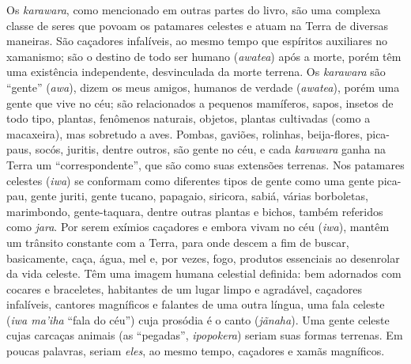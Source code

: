 \noindent Os \emph{karawara}, como mencionado em outras partes do livro, são uma
complexa classe de seres que povoam os patamares celestes e atuam na
Terra de diversas maneiras. São caçadores infalíveis, ao mesmo tempo que
espíritos auxiliares no xamanismo; são o destino de todo ser humano
(\emph{awatea}) após a morte, porém têm uma existência independente,
desvinculada da morte terrena. Os \emph{karawara} são ``gente''
(\emph{awa}), dizem os meus amigos, humanos de verdade (\emph{awatea}),
porém uma gente que vive no céu; são relacionados a pequenos mamíferos,
sapos, insetos de todo tipo, plantas, fenômenos naturais, objetos,
plantas cultivadas (como a macaxeira), mas sobretudo a aves. Pombas,
gaviões, rolinhas, beija-flores, pica-paus, socós, juritis, dentre
outros, são gente no céu, e cada \emph{karawara} ganha na Terra um
``correspondente'', que são como suas extensões terrenas. Nos patamares
celestes (\emph{iwa}) se conformam como diferentes tipos de gente como
uma gente pica-pau, gente juriti, gente tucano, papagaio, siricora,
sabiá, várias borboletas, marimbondo, gente-taquara, dentre outras
plantas e bichos, também referidos como \emph{jara}. Por serem exímios
caçadores e embora vivam no céu (\emph{iwa}), mantêm um trânsito
constante com a Terra, para onde descem a fim de buscar, basicamente,
caça, água, mel e, por vezes, fogo, produtos essenciais ao desenrolar da
vida celeste. Têm uma imagem humana celestial definida: bem adornados
com cocares e braceletes, habitantes de um lugar limpo e agradável,
caçadores infalíveis, cantores magníficos e falantes de uma outra
língua, uma fala celeste (\emph{iwa ma'iha} ``fala do céu'') cuja
prosódia é o canto (\emph{jãnaha}). Uma gente celeste cujas carcaças
animais (as ``pegadas'', \emph{ipopokera}) seriam suas formas terrenas.
Em poucas palavras, seriam \emph{eles}, ao mesmo tempo, caçadores e
xamãs magníficos.


